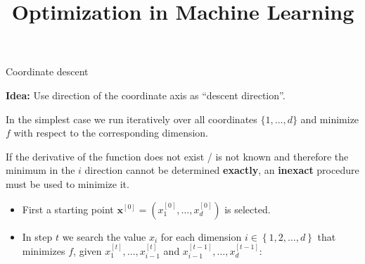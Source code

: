 \documentclass[11pt,compress,t,notes=noshow, xcolor=table]{beamer}
\title{Optimization in Machine Learning}
\date{}
\begin{document}
\sloppy


\begin{vbframe}{Coordinate descent}

\textbf{Idea:} Use direction of the coordinate axis as \enquote{descent direction}.


\lz

In the simplest case we run iteratively over all coordinates $\{1, ...,d\}$ and minimize $f$ with respect to the corresponding dimension.

\lz

If the derivative of the function does not exist / is not known and therefore the minimum in the $i$ direction cannot be determined \textbf{exactly}, an \textbf{inexact} procedure must be used to minimize it.

\framebreak

\begin{itemize}
\item First a starting point $\bm{x}^{[0]} = \left(x^{[0]}_1, \hdots, x^{[0]}_d\right)$ is selected.
\item In step $t$ we search the value $x_i$ for each dimension $i \in \left\{1,2,\hdots,d\right\}$
that minimizes $f$, given $x^{[t]}_1, \hdots,x^{[t]}_{i-1}$ and $x^{[t-1]}_{i-1}, \hdots,x^{[t-1]}_d$:
\end{itemize}




\end{vbframe}
\end{document}
